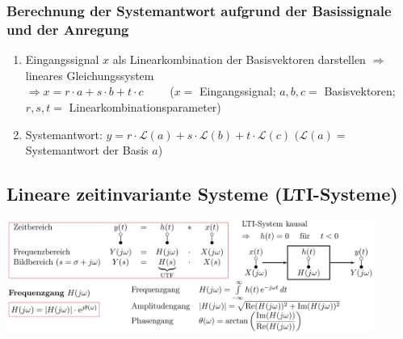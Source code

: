 		\subsubsection{Berechnung der Systemantwort aufgrund der Basissignale und der Anregung}
			\begin{enumerate}
				\item Eingangssignal $x$ als Linearkombination der Basisvektoren darstellen	$\Rightarrow$ lineares Gleichungssystem\\
				\quad $\Rightarrow x=r\cdot a + s\cdot b + t\cdot c\qquad$ ($x=$ Eingangssignal; $a,b,c=$ Basisvektoren; $r,s,t=$ Linearkombinationsparameter)\\ 
				\item Systemantwort: \quad $y=r\cdot \mathcal{L}(a) + s\cdot \mathcal{L}(b) + t\cdot \mathcal{L}(c)$ \qquad\quad $(\mathcal{L}(a)=$ Systemantwort der Basis $a$)
			\end{enumerate}
	
	\subsection{Lineare zeitinvariante Systeme (LTI-Systeme) }
		\includegraphics[width=0.9\textwidth]{./bilder/LTIAntwort.png} \\
	
